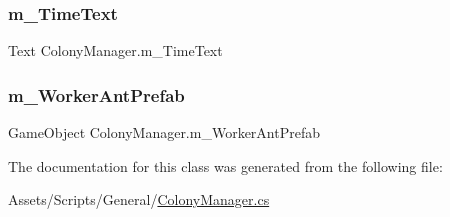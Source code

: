 \subsubsection{\texorpdfstring{m\_TimeText}{m\_TimeText}}
{\footnotesize\ttfamily Text Colony\+Manager.\+m\+\_\+\+Time\+Text}

\mbox{\label{class_colony_manager_a212b62df0cbb2542a0f8c8d236fc05c1}} 
\subsubsection{\texorpdfstring{m\_WorkerAntPrefab}{m\_WorkerAntPrefab}}
{\footnotesize\ttfamily Game\+Object Colony\+Manager.\+m\+\_\+\+Worker\+Ant\+Prefab}



The documentation for this class was generated from the following file\+:\begin{DoxyCompactItemize}
\item 
Assets/\+Scripts/\+General/\mbox{\hyperlink{_colony_manager_8cs}{Colony\+Manager.\+cs}}\end{DoxyCompactItemize}

